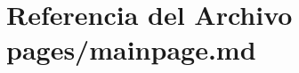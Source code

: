 \hypertarget{mainpage_8md}{}\section{Referencia del Archivo pages/mainpage.md}
\label{mainpage_8md}
